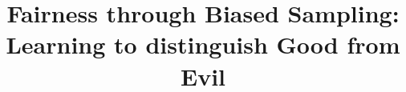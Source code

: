 \documentclass[sigconf,authordraft]{acmart}
\begin{document}
\def\yy#1{{\color{red}\textbf{yy: #1}}\xspace}
\def\sk#1{{\color{blue}\textbf{SK: #1}}\xspace}
\title{Fairness through Biased Sampling: Learning to distinguish Good from Evil}


%


\end{document}
